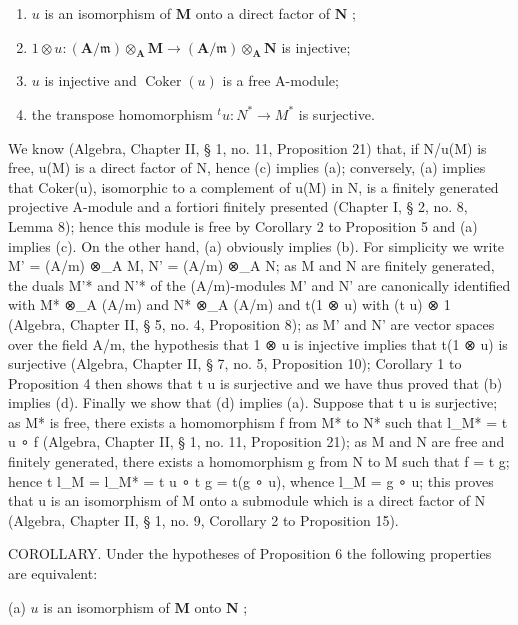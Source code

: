 \begin{enumerate}
\def\labelenumi{(\alph{enumi})}
\item
  \(u\) is an isomorphism of \(\mathbf{M}\) onto a direct factor of \(\mathbf{N}\) ;
\item
  \(1 \otimes u: (\mathbf{A} / \mathfrak{m}) \otimes_{\mathbf{A}} \mathbf{M} \to (\mathbf{A} / \mathfrak{m}) \otimes_{\mathbf{A}} \mathbf{N}\) is injective;
\item
  \(u\) is injective and \(\operatorname{Coker}(u)\) is a free A-module;
\item
  the transpose homomorphism \(^{t}u: N^{*} \rightarrow M^{*}\) is surjective.
\end{enumerate}

We know (Algebra, Chapter II, § 1, no. 11, Proposition 21) that, if N/u(M) is free, u(M) is a direct factor of N, hence (c) implies (a); conversely, (a) implies that Coker(u), isomorphic to a complement of u(M) in N, is a finitely generated projective A-module and a fortiori finitely presented (Chapter I, § 2, no. 8, Lemma 8); hence this module is free by Corollary 2 to Proposition 5 and (a) implies (c). On the other hand, (a) obviously implies (b). For simplicity we write M' = (A/m) ⊗\_A M, N' = (A/m) ⊗\_A N; as M and N are finitely generated, the duals M'* and N'* of the (A/m)-modules M' and N' are canonically identified with M* ⊗\_A (A/m) and N* ⊗\_A (A/m) and t(1 ⊗ u) with (t u) ⊗ 1 (Algebra, Chapter II, § 5, no. 4, Proposition 8); as M' and N' are vector spaces over the field A/m, the hypothesis that 1 ⊗ u is injective implies that t(1 ⊗ u) is surjective (Algebra, Chapter II, § 7, no. 5, Proposition 10); Corollary 1 to Proposition 4 then shows that t u is surjective and we have thus proved that (b) implies (d). Finally we show that (d) implies (a). Suppose that t u is surjective; as M* is free, there exists a homomorphism f from M* to N* such that l\_M* = t u ∘ f (Algebra, Chapter II, § 1, no. 11, Proposition 21); as M and N are free and finitely generated, there exists a homomorphism g from N to M such that f = t g; hence t l\_M = l\_M* = t u ∘ t g = t(g ∘ u), whence l\_M = g ∘ u; this proves that u is an isomorphism of M onto a submodule which is a direct factor of N (Algebra, Chapter II, § 1, no. 9, Corollary 2 to Proposition 15).

COROLLARY. Under the hypotheses of Proposition 6 the following properties are equivalent:

(a) \(u\) is an isomorphism of \(\mathbf{M}\) onto \(\mathbf{N}\) ;

